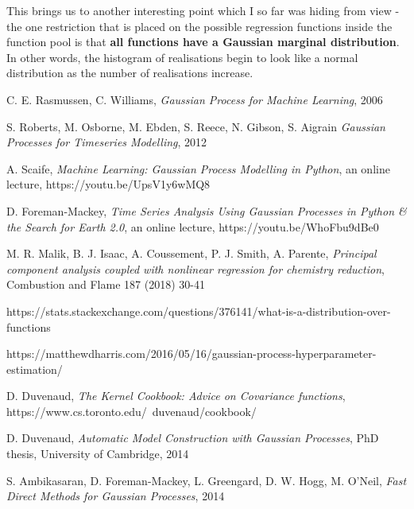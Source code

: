 \documentclass[10pt,twocolumn]{article}
\begin{document}
This brings us to another interesting point which I so far was hiding from view - the one restriction that is placed on the possible regression functions inside the function pool is that \textbf{all functions have a Gaussian marginal distribution}.
In other words, the histogram of realisations begin to look like a normal distribution as the number of realisations increase.















\thebibliography{}

 C. E. Rasmussen, C. Williams, \textit{Gaussian Process for Machine Learning}, 2006

 S. Roberts, M. Osborne, M. Ebden, S. Reece, N. Gibson, S. Aigrain \textit{Gaussian Processes for Timeseries Modelling}, 2012

 A. Scaife, \textit{Machine Learning: Gaussian Process Modelling in Python}, an online lecture, https://youtu.be/UpsV1y6wMQ8

 D. Foreman-Mackey, \textit{Time Series Analysis Using Gaussian Processes in Python \& the Search for Earth 2.0}, an online lecture, https://youtu.be/WhoFbu9dBe0

 M. R. Malik, B. J. Isaac, A. Coussement, P. J. Smith, A. Parente, \textit{Principal component analysis coupled with nonlinear regression for chemistry reduction}, Combustion and Flame 187 (2018) 30-41

 https://stats.stackexchange.com/questions/376141/what-is-a-distribution-over-functions

\bibitem{} https://matthewdharris.com/2016/05/16/gaussian-process-hyperparameter-estimation/

 D. Duvenaud, \textit{The Kernel Cookbook: Advice on Covariance functions}, https://www.cs.toronto.edu/~duvenaud/cookbook/


 D. Duvenaud, \textit{Automatic Model Construction with Gaussian Processes}, PhD thesis,  University of Cambridge, 2014

 S. Ambikasaran, D. Foreman-Mackey, L. Greengard, D. W. Hogg, M. O'Neil, \textit{Fast Direct Methods for Gaussian Processes}, 2014
\end{document}

